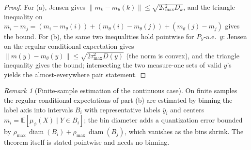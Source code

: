 \documentclass{article}
\theoremstyle{plain}
\theoremstyle{remark}
\newtheorem{remark}{Remark}[section]
\newcommand{\E}{\mathbb{E}}
\begin{document}
\begin{proof}
For (a), Jensen gives $\|m_k - m_\theta(k)\| \le \sqrt{2\tau^2_{\max} D_k}$, and the
triangle inequality on
$m_i - m_j = (m_i - m_\theta(i)) + (m_\theta(i) - m_\theta(j))
+ (m_\theta(j) - m_j)$ gives the bound. For (b), the same two
inequalities hold pointwise for $P_Y$-a.e.\ $y$: Jensen on the regular conditional
expectation gives
$\|m(y) - m_\theta(y)\| \le \sqrt{2\tau^2_{\max} D(y)}$ (the norm is convex), and
the triangle inequality gives the bound; intersecting
the two measure-one sets of valid $y$'s yields the almost-everywhere pair statement.
\end{proof}

\begin{remark}[Finite-sample estimation of the continuous case]
\label{rem:pgib-binning}
On finite samples the regular conditional expectations of part (b) are estimated by
binning the label axis into intervals $B_i$ with representative labels $\bar y_i$
and centers $m_i = \E[\mu_\phi(X) \mid Y \in B_i]$; the bin diameter adds a
quantization error bounded by
$\rho_{\max}\,\operatorname{diam}(B_i) + \rho_{\max}\,\operatorname{diam}(B_j)$, which
vanishes as the bins shrink. The theorem itself is stated pointwise and needs no
binning.
\end{remark}
\end{document}
